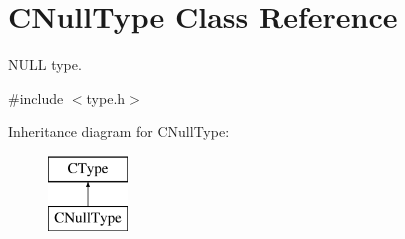 \hypertarget{classCNullType}{\section{C\-Null\-Type Class Reference}
\label{classCNullType}
}


N\-U\-L\-L type.  




{\ttfamily \#include $<$type.\-h$>$}

Inheritance diagram for C\-Null\-Type\-:\begin{figure}[H]
\begin{center}
\leavevmode
\includegraphics[height=2.000000cm]{classCNullType}
\end{center}
\end{figure}
